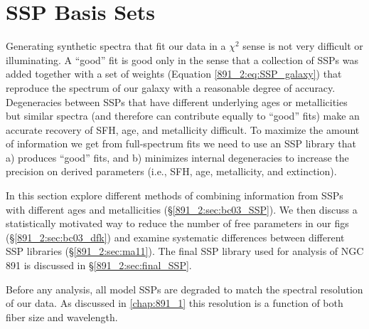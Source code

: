\section{SSP Basis Sets}
\label{891_2:sec:SSP_sets}

Generating synthetic spectra that fit our data in a $\chi^2$ sense is
not very difficult or illuminating. A ``good'' fit is good only in the
sense that a collection of SSPs was added together with a set of
weights (Equation \ref{891_2:eq:SSP_galaxy}) that reproduce the spectrum of
our galaxy with a reasonable degree of accuracy. Degeneracies between
SSPs that have different underlying ages or metallicities but similar
spectra (and therefore can contribute equally to ``good'' fits) make
an accurate recovery of SFH, age, and metallicity difficult. To
maximize the amount of information we get from full-spectrum fits we
need to use an SSP library that a) produces ``good'' fits, and b)
minimizes internal degeneracies to increase the precision on derived
parameters (i.e., SFH, age, metallicity, and extinction).

In this section explore different methods of combining information
from SSPs with different ages and metallicities
(\S\ref{891_2:sec:bc03_SSP}). We then discuss a statistically motivated way
to reduce the number of free parameters in our figs
(\S\ref{891_2:sec:bc03_dfk}) and examine systematic differences between
different SSP libraries (\S\ref{891_2:sec:ma11}). The final SSP library used
for analysis of NGC 891 is discussed in \S\ref{891_2:sec:final_SSP}.

Before any analysis, all model SSPs are degraded to match the spectral
resolution of our data. As discussed in \ref{chap:891_1} this
resolution is a function of both \GP fiber size and wavelength.


